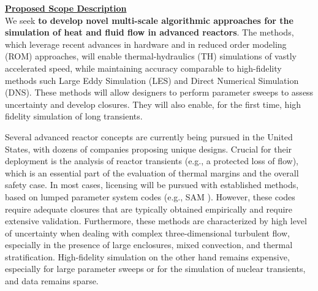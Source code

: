 \vspace*{.0in}\noindent \underline{\textbf{Proposed Scope Description}}%
\\[-2ex]

We seek \textbf{to develop novel multi-scale algorithmic approaches for the
simulation of heat and fluid flow in advanced reactors}. The methods, which
leverage recent advances in hardware and in reduced order modeling (ROM)
approaches, will enable thermal-hydraulics (TH) simulations of vastly
accelerated speed, while maintaining accuracy comparable to high-fidelity
methods such Large Eddy Simulation (LES) and Direct Numerical Simulation (DNS).
These methods will allow designers to perform parameter sweeps to assess
uncertainty and develop closures. They will also enable, for the first time,
high fidelity simulation of long transients.

Several  advanced reactor concepts are currently being pursued in the United
States, with dozens of companies proposing unique designs. Crucial for their
deployment is the analysis of  reactor transients (e.g., a protected loss of
flow), which is an essential part of the evaluation of thermal margins and the overall
safety case.  In most cases, licensing will be pursued with established
methods, based on lumped parameter system codes (e.g., SAM \cite{hu2021}).
However, these codes require adequate closures that are typically obtained
empirically and require extensive validation. Furthermore, these methods are
characterized by high level of uncertainty when dealing with complex
three-dimensional turbulent flow, especially in the presence of large
enclosures, mixed convection, and thermal stratification. High-fidelity
simulation on the other hand remains expensive, especially for
large parameter sweeps or for the simulation of nuclear transients, and data
remains sparse.

